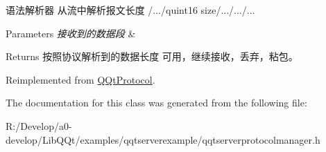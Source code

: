 语法解析器 从流中解析报文长度 /.../quint16 size/.../.../... 


\begin{DoxyParams}{Parameters}
{\em 接收到的数据段} & \\
\hline
\end{DoxyParams}
\begin{DoxyReturn}{Returns}
按照协议解析到的数据长度 可用，继续接收，丢弃，粘包。 
\end{DoxyReturn}


Reimplemented from \mbox{\hyperlink{class_q_qt_protocol_a00fd0c1ac23379ed3b9b25da9a34f39b}{Q\+Qt\+Protocol}}.



The documentation for this class was generated from the following file\+:\begin{DoxyCompactItemize}
\item 
R\+:/\+Develop/a0-\/develop/\+Lib\+Q\+Qt/examples/qqtserverexample/qqtserverprotocolmanager.\+h\end{DoxyCompactItemize}
